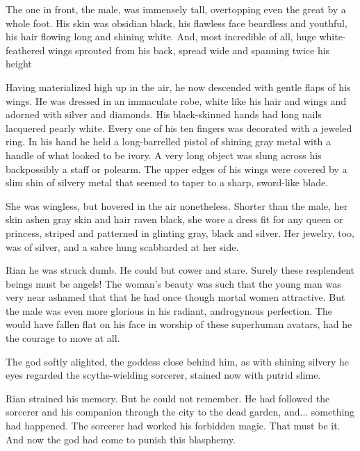The one in front, the male, was immensely tall, overtopping even the great \scatha{} by a whole foot. 
His skin was obsidian black, his flawless face beardless and youthful, his hair flowing long and shining white. 
And, most incredible of all, huge white-feathered wings sprouted from his back, spread wide and spanning twice his height

Having materialized high up in the air, he now descended with gentle flaps of his wings. 
He was dressed in an immaculate robe, white like his hair and wings and adorned with silver and diamonds. 
His black-skinned hands had long nails lacquered pearly white. 
Every one of his ten fingers was decorated with a jeweled ring. 
In his hand he held a long-barrelled pistol of shining gray metal with a handle of what looked to be ivory. 
A very long object was slung across his back\dash possibly a staff or polearm. 
The upper edges of his wings were covered by a slim shin of silvery metal that seemed to taper to a sharp, sword-like blade. 

She was wingless, but hovered in the air nonetheless. 
Shorter than the male, her skin ashen gray skin and hair raven black,
she wore a dress fit for any queen or princess, striped and patterned in glinting gray, black and silver. Her jewelry, too, was of silver, and a sabre hung scabbarded at her side. 

Rian he was struck dumb. He could but cower and stare. 
Surely these resplendent beings must be angels! 
The woman's beauty was such that the young man was very near ashamed that that he had once though mortal women attractive. 
But the male was even more glorious in his radiant, androgynous perfection. 
\tho{%
  Such magnificence. Such might. 
  No, not an angel. A god!
  Before my eyes... a god in the flesh!}
The \human{} would have fallen flat on his face in worship of these superhuman avatars, had he the courage to move at all.

The god softly alighted, the goddess close behind him, as with shining silvery he eyes regarded the scythe-wielding sorcerer, stained now with putrid slime. 

Rian strained his memory. 
But he could not remember. He had followed the sorcerer and his companion through the city to the dead garden, and... something had happened. The sorcerer had worked his forbidden magic. That must be it. And now the god had come to punish this blasphemy. 










